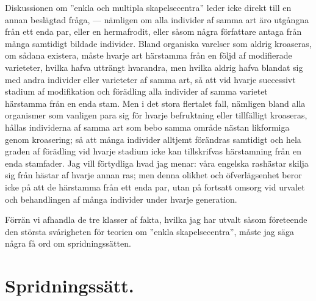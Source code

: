 Diskussionen om ”enkla och multipla skapelsecentra” leder icke direkt till en annan beslägtad fråga, — nämligen om alla individer af samma art äro utgångna från ett enda par, eller en hermafrodit, eller såsom några författare antaga från många samtidigt bildade individer. Bland organiska varelser som aldrig kroaseras, om sådana existera, måste hvarje art härstamma från en följd af modifierade varieteter, hvilka hafva utträngt hvarandra, men hvilka aldrig hafva blandat sig med andra individer eller varieteter af samma art, så att vid hvarje successivt stadium af modifikation och förädling alla individer af samma varietet härstamma från en enda stam. Men i det stora flertalet fall, nämligen bland alla organismer som vanligen para sig för hvarje befruktning eller tillfälligt kroaseras, hållas individerna af samma art som bebo samma område nästan likformiga genom kroasering; så att många individer alltjemt förändras samtidigt och hela graden af förädling vid hvarje stadium icke kan tillskrifvas härstamning från en enda stamfader. Jag vill förtydliga hvad jag menar: våra engelska rashästar skilja sig från hästar af hvarje annan ras; men denna olikhet och öfverlägsenhet beror icke på att de härstamma från ett enda par, utan på fortsatt omsorg vid urvalet och behandlingen af många individer under hvarje generation.

Förrän vi afhandla de tre klasser af fakta, hvilka jag har utvalt såsom företeende den största svårigheten för teorien om ”enkla skapelsecentra”, måste jag säga några få ord om spridningssätten.



\section{Spridningssätt.}

